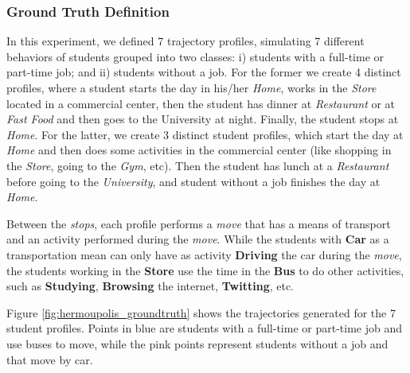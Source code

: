 \documentclass[12pt]{article}
\begin{document}
\subsubsection{Ground Truth Definition}
In this experiment, we defined 7 trajectory profiles, simulating 7 different behaviors of students grouped into two classes: i) students with a full-time or part-time job; and ii) students without a job. For the former we create 4 distinct profiles, where a student starts the day in his/her \textit{Home}, works in the \textit{Store} located in a commercial center, then the student has dinner at \textit{Restaurant} or at \textit{Fast Food} and then goes to the University at night. Finally, the student stops at \textit{Home}. For the latter, we create 3 distinct student profiles, which start the day at \textit{Home} and then does some activities in the commercial center (like shopping in the \textit{Store}, going to the \textit{Gym}, etc). Then the student has lunch at a \textit{Restaurant} before going to the \textit{University}, and student without a job finishes the day at \textit{Home}.

Between the \emph{stops}, each profile performs a \emph{move} that has a means of transport and an activity performed during the \emph{move}. While the students with \textbf{Car} as a transportation mean can only have as activity \textbf{Driving} the car during the \emph{move}, the students working in the \textbf{Store} use the time in the \textbf{Bus} to do other activities, such as \textbf{Studying}, \textbf{Browsing} the internet, \textbf{Twitting}, etc.

Figure \ref{fig:hermoupolis_groundtruth} shows the trajectories generated for the 7 student profiles. Points in blue are students with a full-time or part-time job and use buses to move, while the pink points represent students without a job and that move by car.
\end{document}
